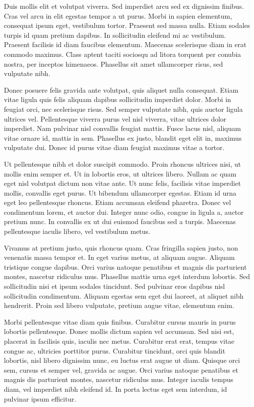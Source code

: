 Duis mollis elit et volutpat viverra. Sed imperdiet arcu sed ex dignissim finibus. Cras vel arcu in elit egestas tempor a ut purus. Morbi in sapien elementum, consequat ipsum eget, vestibulum tortor. Praesent sed massa nulla. Etiam sodales turpis id quam pretium dapibus. In sollicitudin eleifend mi ac vestibulum. Praesent facilisis id diam faucibus elementum. Maecenas scelerisque diam in erat commodo maximus. Class aptent taciti sociosqu ad litora torquent per conubia nostra, per inceptos himenaeos. Phasellus sit amet ullamcorper risus, sed vulputate nibh.

Donec posuere felis gravida ante volutpat, quis aliquet nulla consequat. Etiam vitae ligula quis felis aliquam dapibus sollicitudin imperdiet dolor. Morbi in feugiat orci, nec scelerisque risus. Sed semper vulputate nibh, quis auctor ligula ultrices vel. Pellentesque viverra purus vel nisl viverra, vitae ultrices dolor imperdiet. Nam pulvinar nisl convallis feugiat mattis. Fusce lacus nisl, aliquam vitae ornare id, mattis in sem. Phasellus ex justo, blandit eget elit in, maximus vulputate dui. Donec id purus vitae diam feugiat maximus vitae a tortor.

Ut pellentesque nibh et dolor suscipit commodo. Proin rhoncus ultrices nisi, ut mollis enim semper et. Ut in lobortis eros, ut ultrices libero. Nullam ac quam eget nisl volutpat dictum non vitae ante. Ut nunc felis, facilisis vitae imperdiet mollis, convallis eget purus. Ut bibendum ullamcorper egestas. Etiam id urna eget leo pellentesque rhoncus. Etiam accumsan eleifend pharetra. Donec vel condimentum lorem, et auctor dui. Integer nunc odio, congue in ligula a, auctor pretium nunc. In convallis ex ut dui euismod faucibus sed a turpis. Maecenas pellentesque iaculis libero, vel vestibulum metus.

Vivamus at pretium justo, quis rhoncus quam. Cras fringilla sapien justo, non venenatis massa tempor et. In eget varius metus, at aliquam augue. Aliquam tristique congue dapibus. Orci varius natoque penatibus et magnis dis parturient montes, nascetur ridiculus mus. Phasellus mattis urna eget interdum lobortis. Sed sollicitudin nisi et ipsum sodales tincidunt. Sed pulvinar eros dapibus nisl sollicitudin condimentum. Aliquam egestas sem eget dui laoreet, at aliquet nibh hendrerit. Proin sed libero vulputate, pretium augue vitae, elementum enim.

Morbi pellentesque vitae diam quis finibus. Curabitur cursus mauris in purus lobortis pellentesque. Donec mollis dictum sapien vel accumsan. Sed nisi est, placerat in facilisis quis, iaculis nec metus. Curabitur erat erat, tempus vitae congue ac, ultricies porttitor purus. Curabitur tincidunt, orci quis blandit lobortis, nisl libero dignissim nunc, eu luctus erat augue ut diam. Quisque orci sem, cursus et semper vel, gravida ac augue. Orci varius natoque penatibus et magnis dis parturient montes, nascetur ridiculus mus. Integer iaculis tempus diam, vel imperdiet nibh eleifend id. In porta lectus eget sem interdum, id pulvinar ipsum efficitur.


